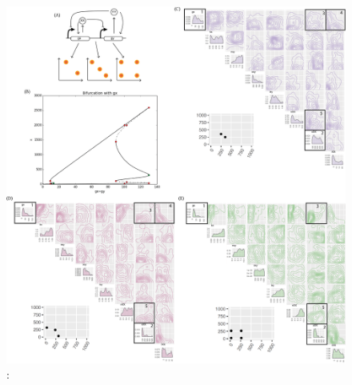{\begin{figure}
	\begin{center}
		\includegraphics[width=\textwidth]{chapterStabilityFinder/images/Lu_234.png}
		\caption[LoF caption]{ \label{fig:lu_234}:}%
	\end{center}
\end{figure}


}
